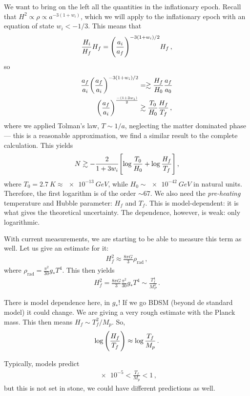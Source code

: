 \documentclass[main.tex]{subfiles}
\begin{document}
We want to bring on the left all the quantities in the inflationary epoch. 
Recall that \(H^2 \propto \rho \propto a^{-3 (1+ w_i)}\), which we will apply to the inflationary epoch with an equation of state \(w_i < - 1/3\). This means that 
%
\begin{align}
\frac{H_i}{H_f} H_f = \qty(\frac{a_i}{a_f})^{-3(1+ w_i) / 2} H_f
\,,
\end{align}
%
so 
%
\begin{align}
\frac{a_f}{a_i} \qty(\frac{a_f}{a_i})^{- 3 (1+ w_i) / 2} &=\gtrsim  
\frac{H_f}{H_0} \frac{a_f}{a_0 } \\
\qty(\frac{a_f}{a_i})^{\frac{-(1 + 3 w_i)}{2}}
&\gtrsim \frac{T_0 }{H_0 } \frac{H_f}{T_f}
\,,
\end{align}
%
where we applied Tolman's law, \(T \sim 1/a\), neglecting the matter dominated phase --- this is a reasonable approximation, we find a similar result to the complete calculation. This yields 
%
\begin{align}
N \gtrsim - \frac{2}{1 + 3 w _i} \qty[ \log \frac{T_0 }{H_0 } + \log \frac{H_f}{T_f}]
\,,
\end{align}
%
where \(T_0 = \SI{2.7}{K} \approx \SI{e-13}{GeV}\), while \(H_0 \sim \SI{e-42}{GeV}\) in natural units. Therefore, the first logarithm is of the order \(\sim 67\). 
We also need the \emph{pre-heating} temperature and Hubble parameter: \(H_f\) and \(T_f\). 
This is model-dependent: it is what gives the theoretical uncertainty. 
The dependence, however, is weak: only logarithmic. 

With current measurements, we are starting to be able to measure this term as well. 
Let us give an estimate for it: 
%
\begin{align}
H_f^2 \approx \frac{8 \pi G}{3} \rho _{\text{rad}}
\,,
\end{align}
%
where \(\rho _{\text{rad}} = \frac{\pi^2}{30} g_* T^{4}\). This then yields 
%
\begin{align}
H^2_f = \frac{8 \pi G}{3} \frac{\pi^2}{30} g_* T^{4} \sim \frac{T_f^4}{M_P^2}
\,.
\end{align}

There is model dependence here, in \(g_*\)! If we go BDSM (beyond de standard model) it could change. 
We are giving a very rough estimate with the Planck mass. This then means \(H_f \sim T_f^2 / M_p\). So, 
%
\begin{align}
\log \qty( \frac{H_f}{T_f}) \approx \log \frac{T_f}{M_p}
\,.
\end{align}

Typically, models predict 
%
\begin{align}
\num{e-5} < \frac{T_f}{M_p} < 1
\,,
\end{align}
%
but this is not set in stone, we could have different predictions as well. 
\end{document}
